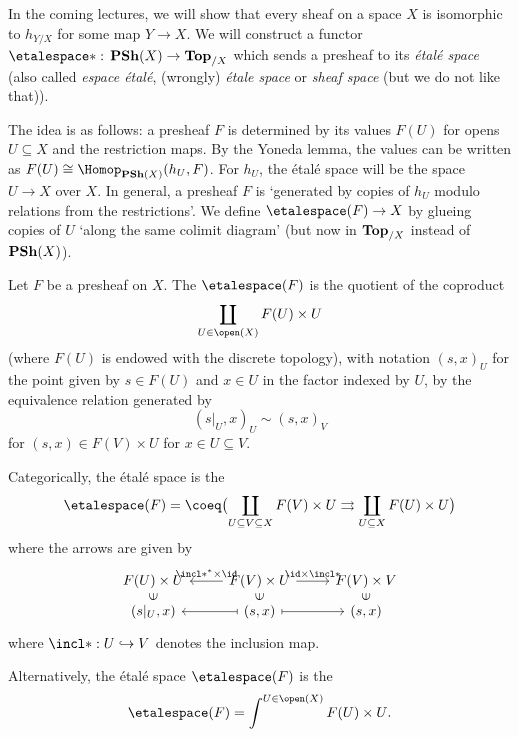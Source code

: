 In the coming lectures, we will show that every sheaf on a space $X$ is isomorphic to $h_{Y/X}$ for some map $Y\to X$.
We will construct a functor $\etalespace*\colon\catPresheaf(X)\to\catTopologicalSpace_{/X}$ which sends a presheaf to its \emph{étalé space} (also called \emph{espace étalé}, (wrongly) \emph{étale space} or \emph{sheaf space} (but we do not like that)).

The idea is as follows: a presheaf $F$ is determined by its values $F(U)$ for opens $U\subseteq X$ and the restriction maps.
By the Yoneda lemma, the values can be written as $F(U)\cong\Hom[\catPresheaf(X)](h_U,F)$.
For $h_U$, the étalé space will be the space $U\to X$ over $X$.
In general, a presheaf $F$ is `generated by copies of $h_U$ modulo relations from the restrictions'.
We define $\etalespace(F)\to X$ by glueing copies of $U$ `along the same colimit diagram' (but now in $\mathbf{Top}_{/X}$ instead of $\operatorname{\mathbf{PSh}}(X)$).

\begin{defn}\label{defn:espace-étalé}
Let $F$ be a presheaf on $X$.
The  $\etalespace(F)$ is the quotient of the coproduct
\[ \coprod_{U\in\open(X)} F(U)\times U \]
(where $F(U)$ is endowed with the discrete topology), with notation $(s,x)_U$ for the point given by $s\in F(U)$ and $x\in U$ in the factor indexed by $U$, by the equivalence relation generated by
\[ (s|_U, x)_U \sim (s, x)_V \]
for $(s,x)\in F(V)\times U$ for $x\in U\subseteq V$.
\end{defn}

Categorically, the étalé space is the 
\[ \etalespace(F) = \coeq\bigl(\coprod_{U\subseteq V\subseteq X} F(V)\times U \rightrightarrows \coprod_{U\subseteq X} F(U)\times U\bigr)\]
where the arrows are given by
\begin{equation*}
    \begin{tikzcd}[row sep=tiny]
        F(U)\times U & F(V)\times U \ar[l, "\incl*^*\times\id"'] \ar[r, "\id\times \incl*"] & F(V)\times V \\
        (s|_U, x) \ar[u, "\in", phantom, marking] & (s,x) \ar[l, mapsto] \ar[r, mapsto] \ar[u, "\in", phantom, marking] & (s,x) \ar[u, "\in", phantom, marking]
    \end{tikzcd}
\end{equation*}
where $\incl*\colon U\hookrightarrow V$ denotes the inclusion map.

Alternatively, the étalé space $\etalespace(F)$ is the 
\[ \etalespace(F) = \int^{U\in\open(X)} F(U)\times U\text{.} \]

